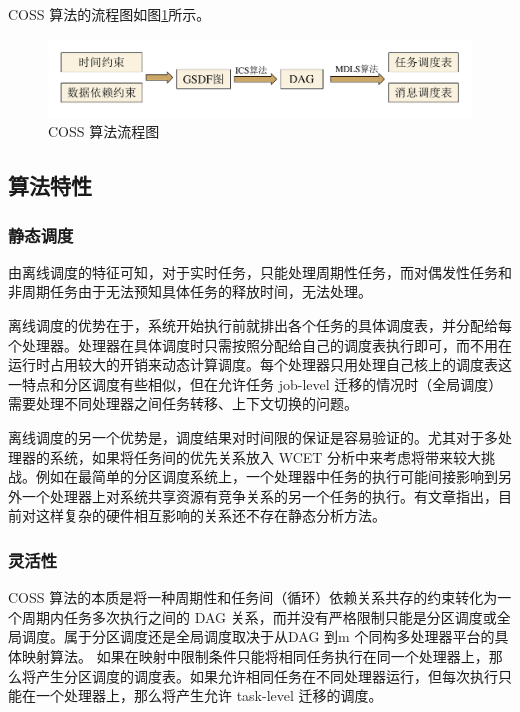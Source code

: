 COSS 算法的流程图如图\ref{SDF-fig-COSS-steps}所示。
\begin{figure}[!hbt]
  \centering
  \includegraphics[height=14ex]{figure/SDF-COSS-steps.pdf}
  \caption{COSS 算法流程图}
  \label{SDF-fig-COSS-steps}
\end{figure}




\subsection{算法特性}

\subsubsection{静态调度}

由离线调度的特征可知，对于实时任务，只能处理周期性任务，而对偶发性任务和非周期任务由于无法预知具体任务的释放时间，无法处理。

离线调度的优势在于，系统开始执行前就排出各个任务的具体调度表，并分配给每个处理器。处理器在具体调度时只需按照分配给自己的调度表执行即可，而不用在运行时占用较大的开销来动态计算调度。每个处理器只用处理自己核上的调度表这一特点和分区调度有些相似，但在允许任务 job-level 迁移的情况时（全局调度）需要处理不同处理器之间任务转移、上下文切换的问题。

离线调度的另一个优势是，调度结果对时间限的保证是容易验证的。尤其对于多处理器的系统，如果将任务间的优先关系放入 WCET 分析中来考虑将带来较大挑战。例如在最简单的分区调度系统上，一个处理器中任务的执行可能间接影响到另外一个处理器上对系统共享资源有竞争关系的另一个任务的执行。有文章指出，目前对这样复杂的硬件相互影响的关系还不存在静态分析方法。


\subsubsection{灵活性}

COSS 算法的本质是将一种周期性和任务间（循环）依赖关系共存的约束转化为一个周期内任务多次执行之间的 DAG 关系，而并没有严格限制只能是分区调度或全局调度。属于分区调度还是全局调度取决于从DAG 到m 个同构多处理器平台的具体映射算法。
如果在映射中限制条件只能将相同任务执行在同一个处理器上，那么将产生分区调度的调度表。如果允许相同任务在不同处理器运行，但每次执行只能在一个处理器上，那么将产生允许 task-level 迁移的调度。%

